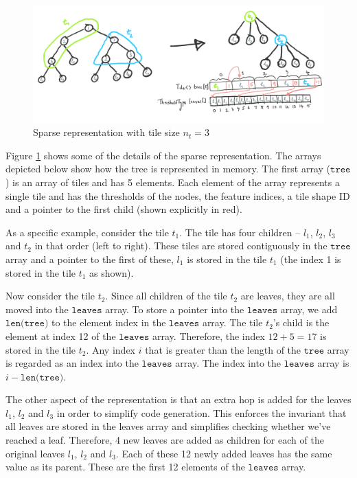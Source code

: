 \begin{figure}
  \centering
  \includegraphics[width=\linewidth]{figures/SparseRep_TileSize3.PNG}
  \caption{Sparse representation with tile size $n_t=3$}
  \label{Fig:SparseRep}
\end{figure}

Figure \ref{Fig:SparseRep} shows some of the details of the sparse representation.
The arrays depicted below show how the tree is represented in memory. The first array ($\texttt{tree}$) is an array of tiles 
and has 5 elements. Each element of the array represents a single tile and has the thresholds of the nodes, the feature
indices, a tile shape ID and a pointer to the first child (shown explicitly in red). 

As a specific example, consider the tile $t_1$. The tile has four children -- $l_1$, $l_2$, $l_3$ and $t_2$ in that order (left to right). These tiles are stored contiguously in the $\texttt{tree}$ array and a pointer to the first of these, $l_1$ is stored in the tile $t_1$ (the index 1 is stored in the tile $t_1$ as shown). 

Now consider the tile $t_2$. Since all children of the tile $t_2$ are leaves, they are all moved into the $\texttt{leaves}$ array.
To store a pointer into the $\texttt{leaves}$ array, we add $\texttt{len(tree)}$ to the element index in the $\texttt{leaves}$ array.
The tile $t_2$'s child is the element at index 12 of the $\texttt{leaves}$ array. Therefore, the index $12 + 5 = 17$ is stored in 
the tile $t_2$. Any index $i$ that is greater than the length of the $\texttt{tree}$ array is regarded as an index into the
$\texttt{leaves}$ array. The index into the $\texttt{leaves}$ array is $i - \texttt{len(tree)}$.

The other aspect of the representation is that an extra hop is added for the leaves $l_1$, $l_2$ and $l_3$ in order to simplify
code generation. This enforces the invariant that all leaves are stored in the leaves array and  simplifies checking whether
we've reached a leaf. Therefore, 4 new leaves are added as children for each of the original leaves $l_1$, $l_2$ and $l_3$. 
Each of these 12 newly added leaves has the same value as its parent. These are the first 12 elements of the $\texttt{leaves}$ array.

